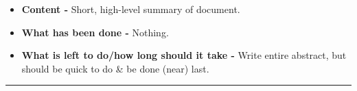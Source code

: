 \begin{itemize}
	\item \textbf{Content -} Short, high-level summary of document.
	\item \textbf{What has been done -} Nothing.
	\item \textbf{What is left to do/how long should it take -} Write entire abstract, but should be quick to do \& be done (near) last.
\end{itemize}

\hrule